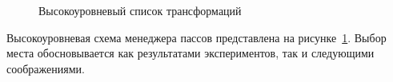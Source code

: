 \begin{figure}[ht]
    \caption{Высокоуровневый список трансформаций}\label{fig:highlevel-mgr}
\end{figure}

Высокоуровневая схема менеджера пассов представлена на рисунке~\cref{fig:highlevel-mgr}. Выбор места обосновывается как результатами экспериментов, так и следующими соображениями.

